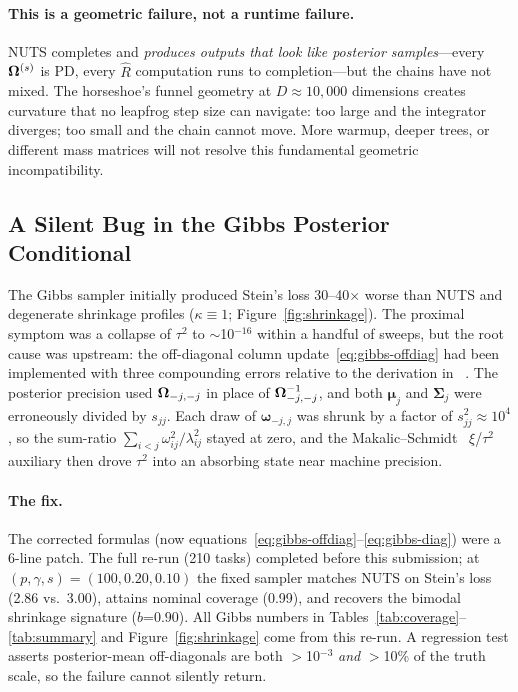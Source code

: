 \documentclass[10pt,conference,compsoc]{IEEEtran}
\begin{document}
\paragraph{This is a geometric failure, not a runtime failure.} NUTS completes and \emph{produces outputs that look like posterior samples}---every $\bm{\Omega}^{(s)}$ is PD, every $\hat{R}$ computation runs to completion---but the chains have not mixed. The horseshoe's funnel geometry at $D \approx 10{,}000$ dimensions creates curvature that no leapfrog step size can navigate: too large and the integrator diverges; too small and the chain cannot move. More warmup, deeper trees, or different mass matrices will not resolve this fundamental geometric incompatibility.

\subsection{A Silent Bug in the Gibbs Posterior Conditional}
\label{sec:gibbs-bug}

The Gibbs sampler initially produced Stein's loss 30--40$\times$ worse than NUTS and degenerate shrinkage profiles ($\kappa \equiv 1$; Figure~\ref{fig:shrinkage}). The proximal symptom was a collapse of $\tau^2$ to $\sim$10$^{-16}$ within a handful of sweeps, but the root cause was upstream: the off-diagonal column update~\eqref{eq:gibbs-offdiag} had been implemented with three compounding errors relative to the derivation in ~\cite{li2019}. The posterior precision used $\bm{\Omega}_{-j,-j}$ in place of $\bm{\Omega}_{-j,-j}^{-1}$, and both $\bm{\mu}_j$ and $\bm{\Sigma}_j$ were erroneously divided by $s_{jj}$. Each draw of $\bm{\omega}_{-j,j}$ was shrunk by a factor of $s_{jj}^2\approx10^4$, so the sum-ratio $\sum_{i<j}\omega_{ij}^2/\lambda_{ij}^2$ stayed at zero, and the Makalic--Schmidt~\cite{makalic2016} $\xi$/$\tau^2$ auxiliary then drove $\tau^2$ into an absorbing state near machine precision.

\paragraph{The fix.} The corrected formulas (now equations~\eqref{eq:gibbs-offdiag}--\eqref{eq:gibbs-diag}) were a 6-line patch. The full re-run (210 tasks) completed before this submission; at $(p,\gamma,s)=(100, 0.20, 0.10)$ the fixed sampler matches NUTS on Stein's loss (2.86 vs.\ 3.00), attains nominal coverage (0.99), and recovers the bimodal shrinkage signature ($b$=$0.90$). All Gibbs numbers in Tables~\ref{tab:coverage}--\ref{tab:summary} and Figure~\ref{fig:shrinkage} come from this re-run. A regression test asserts posterior-mean off-diagonals are both $>$10$^{-3}$ \emph{and} $>$10\% of the truth scale, so the failure cannot silently return.
\end{document}
